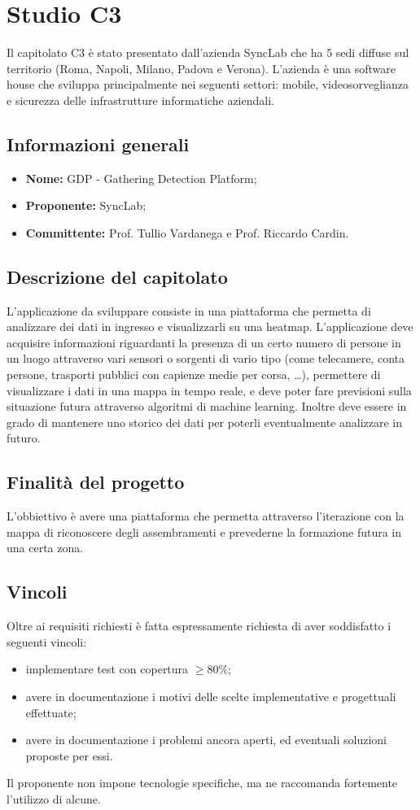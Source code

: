 \section{Studio C3}
Il capitolato C3 è stato presentato dall'azienda SyncLab che ha 5 sedi diffuse sul territorio (Roma, Napoli, Milano, Padova e Verona). L'azienda è una software house che sviluppa principalmente nei seguenti settori: mobile, videosorveglianza e sicurezza delle infrastrutture informatiche aziendali.

\subsection{Informazioni generali}
\begin{itemize}
    \item \textbf{Nome:} GDP - Gathering Detection Platform;
    \item \textbf{Proponente:} SyncLab;
    \item \textbf{Committente:} Prof. Tullio Vardanega e Prof. Riccardo Cardin.
\end{itemize}

\subsection{Descrizione del capitolato}
L'applicazione da sviluppare consiste in una piattaforma che permetta di analizzare dei dati in ingresso e visualizzarli su una heatmap. L'applicazione deve acquisire informazioni riguardanti la presenza di un certo numero di persone in un luogo attraverso vari sensori o sorgenti di vario tipo (come telecamere, conta persone, trasporti pubblici con capienze medie per corsa, …), permettere di visualizzare i dati in una mappa in tempo reale, e deve poter fare previsioni sulla situazione futura attraverso algoritmi di machine learning. Inoltre deve essere in grado di mantenere uno storico dei dati per poterli eventualmente analizzare in futuro.

\subsection{Finalità del progetto}
L'obbiettivo è avere una piattaforma che permetta attraverso l'iterazione con la mappa di riconoscere degli assembramenti e prevederne la formazione futura in una certa zona.

\subsection{Vincoli}
Oltre ai requisiti richiesti è fatta espressamente richiesta di aver soddisfatto i seguenti vincoli:
\begin{itemize}
    \item implementare test con copertura $\geq 80\%$;
    \item avere in documentazione i motivi delle scelte implementative e progettuali effettuate;
    \item avere in documentazione i problemi ancora aperti, ed eventuali soluzioni proposte per essi.
\end{itemize}
Il proponente non impone tecnologie specifiche, ma ne raccomanda fortemente l’utilizzo di alcune.

